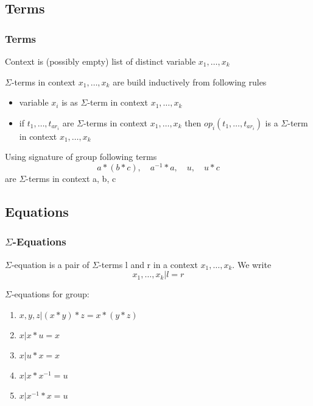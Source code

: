 \documentclass{beamer}
\begin{document}
\subsection{Terms}
\begin{frame}
    \frametitle{Terms}
    \begin{definition}
        Context is (possibly empty) list of distinct variable $x_1, \ldots, x_k$
    \end{definition}

    \begin{definition}
        $\Sigma$-terms in context $x_1, \ldots, x_k$ are build inductively from following rules
        \begin{itemize}
            \item variable $x_i$ is as $\Sigma$-term in context $x_1, \ldots, x_k$
            \item if $t_1, \ldots, t_{ar_i}$ are $\Sigma$-terms in context $x_1, \ldots, x_k$ 
            then $op_i(t_1, \ldots, t_{ar_i})$ is a $\Sigma$-term in context $x_1, \ldots, x_k$
        \end{itemize}
       

    \end{definition}

    \begin{example}
        Using signature of group
        following terms
        \[
          a * (b * c),\quad a^{-1} * a,\quad u,\quad u * c  
        \] are $\Sigma$-terms in context a, b, c
    \end{example}
\end{frame}


\subsection{Equations}
\begin{frame}
    \frametitle{$\Sigma$-Equations}
    \begin{definition}
        $\Sigma$-equation is a pair of $\Sigma$-terms l and r in a context $x_1, \ldots, x_k$. We write
        \[
            x_1, \ldots, x_k | l = r   
        \]
    \end{definition}
    \begin{example}
        $\Sigma$-equations for group:
        \begin{enumerate}
            \item $x, y, z | (x * y) * z = x * (y * z)$
            \item $x | x * u = x$
            \item $x | u * x = x$
            \item $x | x * x^{-1} = u$
            \item $x | x^{-1} * x = u$
        \end{enumerate}
    \end{example}


\end{frame}
\end{document}
